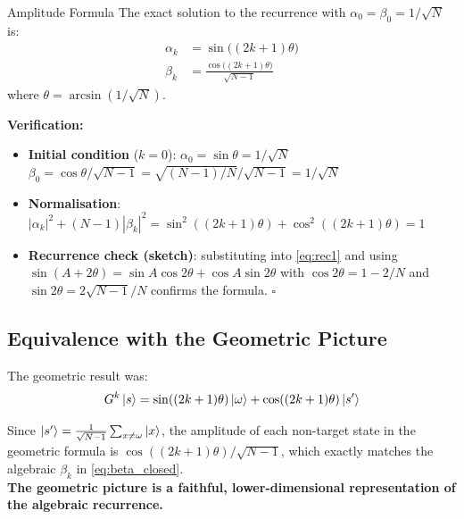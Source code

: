 \documentclass[12pt,a4paper]{article}
\begin{document}
\begin{thmbox}{Amplitude Formula}
The exact solution to the recurrence with $\alpha_0=\beta_0=1/\sqrt{N}$ is:
\begin{align}
  \alpha_k &= \sin\!\bigl((2k+1)\theta\bigr) \label{eq:alpha_closed}\\[4pt]
  \beta_k  &= \frac{\cos\!\bigl((2k+1)\theta\bigr)}{\sqrt{N-1}} \label{eq:beta_closed}
\end{align}
where $\theta = \arcsin(1/\sqrt{N})$.
\end{thmbox}

\textbf{Verification:}
\begin{itemize}
  \item \textbf{Initial condition} ($k=0$): $\alpha_0 = \sin\theta = 1/\sqrt{N}$\,\checkmark \quad $\beta_0 = \cos\theta/\sqrt{N-1} = \sqrt{(N-1)/N}/\sqrt{N-1} = 1/\sqrt{N}$\,\checkmark
  \item \textbf{Normalisation}: $|\alpha_k|^2 + (N-1)|\beta_k|^2 = \sin^2((2k+1)\theta) + \cos^2((2k+1)\theta) = 1$\,\checkmark
  \item \textbf{Recurrence check (sketch)}: substituting into \eqref{eq:rec1} and using $\sin(A+2\theta) = \sin A\cos 2\theta + \cos A\sin 2\theta$ with $\cos 2\theta = 1-2/N$ and $\sin 2\theta = 2\sqrt{N-1}/N$ confirms the formula. $\square$
\end{itemize}

\subsection{Equivalence with the Geometric Picture}

The geometric result was:
\[
  G^k\ket{s} = \sin((2k+1)\theta)\ket{\omega} + \cos((2k+1)\theta)\ket{s'}
\]

Since $\ket{s'} = \frac{1}{\sqrt{N-1}}\sum_{x\neq\omega}\ket{x}$, the amplitude of each non-target state in the geometric formula is $\cos((2k+1)\theta)/\sqrt{N-1}$, which exactly matches the algebraic $\beta_k$ in \eqref{eq:beta_closed}. \\[4pt]
\textbf{The geometric picture is a faithful, lower-dimensional representation of the algebraic recurrence.}
\end{document}
